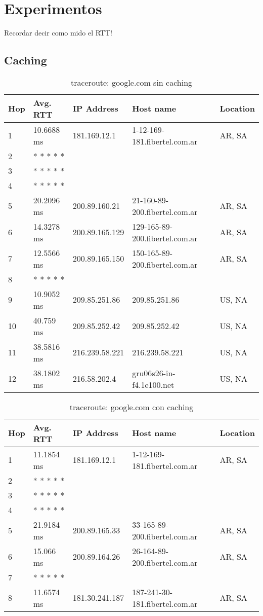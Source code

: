 \section{Experimentos}

Recordar decir como mido el RTT!

\subsection{Caching}

\begin{table}[H]
\caption{traceroute: google.com sin caching}
\centering
\begin{tabular}{@{}lllll@{}}
\toprule
Hop & Avg. RTT & IP Address & Host name & Location\\ \midrule
1 & 10.6688 ms & 181.169.12.1 & 1-12-169-181.fibertel.com.ar & AR, SA\\
2 &  * * * * * &  &  &  \\
3 &  * * * * * &  &  &  \\
4 &  * * * * * &  &  &  \\
5 & 20.2096 ms & 200.89.160.21 & 21-160-89-200.fibertel.com.ar & AR, SA\\
6 & 14.3278 ms & 200.89.165.129 & 129-165-89-200.fibertel.com.ar & AR, SA\\
7 & 12.5566 ms & 200.89.165.150 & 150-165-89-200.fibertel.com.ar & AR, SA\\
8 &  * * * * * &  &  &  \\
9 & 10.9052 ms & 209.85.251.86 & 209.85.251.86 & US, NA\\
10 & 40.759 ms & 209.85.252.42 & 209.85.252.42 & US, NA\\
11 & 38.5816 ms & 216.239.58.221 & 216.239.58.221 & US, NA\\
12 & 38.1802 ms & 216.58.202.4 & gru06s26-in-f4.1e100.net & US, NA\\ \bottomrule
\end{tabular}
\label{google}
\end{table}


\begin{table}[H]
\caption{traceroute: google.com con caching}
\centering
\begin{tabular}{@{}lllll@{}}
\toprule
Hop & Avg. RTT & IP Address & Host name & Location\\ \midrule
1 & 11.1854 ms & 181.169.12.1 & 1-12-169-181.fibertel.com.ar & AR, SA\\
2 &  * * * * * &  &  &  \\
3 &  * * * * * &  &  &  \\
4 &  * * * * * &  &  &  \\
5 & 21.9184 ms & 200.89.165.33 & 33-165-89-200.fibertel.com.ar & AR, SA\\
6 & 15.066 ms & 200.89.164.26 & 26-164-89-200.fibertel.com.ar & AR, SA\\
7 &  * * * * * &  &  &  \\
8 & 11.6574 ms & 181.30.241.187 & 187-241-30-181.fibertel.com.ar & AR, SA\\ \bottomrule
\end{tabular}
\label{googlecache}
\end{table}

